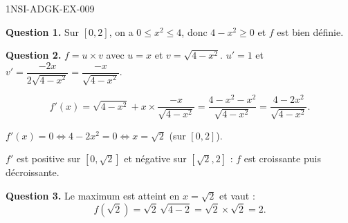 \begin{corrige}{1NSI-ADGK-EX-009}

\textbf{Question 1.} Sur $[0,2]$, on a $0 \leq x^2 \leq 4$, donc $4 - x^2 \geq 0$ et $f$ est bien définie.


\textbf{Question 2.} $f = u \times v$ avec $u=x$ et $v=\sqrt{4-x^2}$.
$u'=1$ et $v' = \dfrac{-2x}{2\sqrt{4-x^2}} = \dfrac{-x}{\sqrt{4-x^2}}$.

\[ f'(x) = \sqrt{4-x^2} + x \times \frac{-x}{\sqrt{4-x^2}} = \frac{4-x^2-x^2}{\sqrt{4-x^2}} = \frac{4-2x^2}{\sqrt{4-x^2}}. \]

$f'(x) = 0 \iff 4-2x^2 = 0 \iff x = \sqrt{2}$ (sur $[0,2]$).

$f'$ est positive sur $[0,\sqrt{2}]$ et négative sur $[\sqrt{2}, 2]$ : $f$ est croissante puis décroissante.

\textbf{Question 3.} Le maximum est atteint en $x = \sqrt{2}$ et vaut :
\[ f(\sqrt{2}) = \sqrt{2}\,\sqrt{4-2} = \sqrt{2} \times \sqrt{2} = \boxed{2}. \]

\end{corrige}
